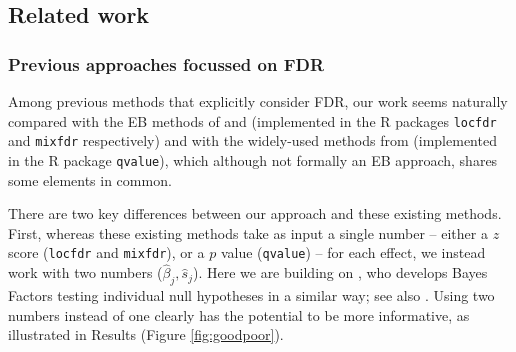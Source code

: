 \documentclass[11pt]{article}
\def\bhat{\hat{\beta}}
\def\shat{\hat{s}}
\def\qvalue{{\tt qvalue}\xspace}
\def\locfdr{{\tt locfdr}\xspace}
\def\mixfdr{{\tt mixfdr}\xspace}
\begin{document}


\subsection*{Related work}

\subsubsection*{Previous approaches focussed on FDR}

Among previous methods that explicitly consider FDR,
our work seems naturally compared with the EB methods of \cite{efron2008microarrays} and \cite{muralidharan2010empirical}
 (implemented in the R packages \locfdr and \mixfdr respectively) and with the widely-used methods from  \cite{storey.03} (implemented in the R package \qvalue), which although not formally an EB approach, shares some elements in common.

There are two key differences between our approach and these existing methods. First, 
whereas these existing methods take as input a single number -- either a $z$ score (\locfdr and \mixfdr), or a $p$ value (\qvalue) -- for each effect, 
we instead work with two numbers ($\bhat_j,\shat_j$). Here we are building on \cite{wakefield:2009}, who develops Bayes Factors testing
individual null hypotheses in a similar way; see also \cite{efron1993bayes}.
Using two numbers instead of one clearly has the potential to be more informative, as illustrated in Results 
(Figure \ref{fig:goodpoor}).

\end{document}
